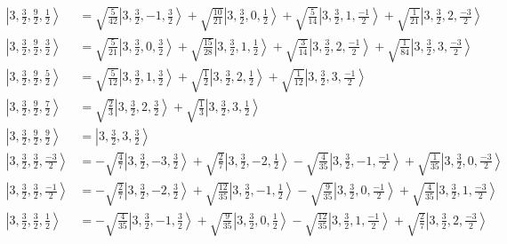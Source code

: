 \documentclass{report}
\newcommand{\ket}[1]{\left| #1 \right>} %
\begin{document}
\begin{align*}
\ket{ 3 ,  \frac{3}{2} ,  \frac{9}{2} ,  \frac{1}{2}  } &=  \sqrt{  \frac{5}{42}  } \ket{ 3 ,  \frac{3}{2} ,  -1 ,  \frac{3}{2}  } + \sqrt{  \frac{10}{21}  } \ket{ 3 ,  \frac{3}{2} ,  0 ,  \frac{1}{2}  } + \sqrt{  \frac{5}{14}  } \ket{ 3 ,  \frac{3}{2} ,  1 ,  \frac{-1}{2}  } + \sqrt{  \frac{1}{21}  } \ket{ 3 ,  \frac{3}{2} ,  2 ,  \frac{-3}{2}  } \\
\ket{ 3 ,  \frac{3}{2} ,  \frac{9}{2} ,  \frac{3}{2}  } &=  \sqrt{  \frac{5}{21}  } \ket{ 3 ,  \frac{3}{2} ,  0 ,  \frac{3}{2}  } + \sqrt{  \frac{15}{28}  } \ket{ 3 ,  \frac{3}{2} ,  1 ,  \frac{1}{2}  } + \sqrt{  \frac{3}{14}  } \ket{ 3 ,  \frac{3}{2} ,  2 ,  \frac{-1}{2}  } + \sqrt{  \frac{1}{84}  } \ket{ 3 ,  \frac{3}{2} ,  3 ,  \frac{-3}{2}  } \\
\ket{ 3 ,  \frac{3}{2} ,  \frac{9}{2} ,  \frac{5}{2}  } &=  \sqrt{  \frac{5}{12}  } \ket{ 3 ,  \frac{3}{2} ,  1 ,  \frac{3}{2}  } + \sqrt{  \frac{1}{2}  } \ket{ 3 ,  \frac{3}{2} ,  2 ,  \frac{1}{2}  } + \sqrt{  \frac{1}{12}  } \ket{ 3 ,  \frac{3}{2} ,  3 ,  \frac{-1}{2}  } \\
\ket{ 3 ,  \frac{3}{2} ,  \frac{9}{2} ,  \frac{7}{2}  } &=  \sqrt{  \frac{2}{3}  } \ket{ 3 ,  \frac{3}{2} ,  2 ,  \frac{3}{2}  } + \sqrt{  \frac{1}{3}  } \ket{ 3 ,  \frac{3}{2} ,  3 ,  \frac{1}{2}  } \\
\ket{ 3 ,  \frac{3}{2} ,  \frac{9}{2} ,  \frac{9}{2}  } &=  \ket{ 3 ,  \frac{3}{2} ,  3 ,  \frac{3}{2}  } \\
\ket{ 3 ,  \frac{3}{2} ,  \frac{3}{2} ,  \frac{-3}{2}  } &=  - \sqrt{  \frac{4}{7}  } \ket{ 3 ,  \frac{3}{2} ,  -3 ,  \frac{3}{2}  } + \sqrt{  \frac{2}{7}  } \ket{ 3 ,  \frac{3}{2} ,  -2 ,  \frac{1}{2}  } - \sqrt{  \frac{4}{35}  } \ket{ 3 ,  \frac{3}{2} ,  -1 ,  \frac{-1}{2}  } + \sqrt{  \frac{1}{35}  } \ket{ 3 ,  \frac{3}{2} ,  0 ,  \frac{-3}{2}  } \\
\ket{ 3 ,  \frac{3}{2} ,  \frac{3}{2} ,  \frac{-1}{2}  } &=  - \sqrt{  \frac{2}{7}  } \ket{ 3 ,  \frac{3}{2} ,  -2 ,  \frac{3}{2}  } + \sqrt{  \frac{12}{35}  } \ket{ 3 ,  \frac{3}{2} ,  -1 ,  \frac{1}{2}  } - \sqrt{  \frac{9}{35}  } \ket{ 3 ,  \frac{3}{2} ,  0 ,  \frac{-1}{2}  } + \sqrt{  \frac{4}{35}  } \ket{ 3 ,  \frac{3}{2} ,  1 ,  \frac{-3}{2}  } \\
\ket{ 3 ,  \frac{3}{2} ,  \frac{3}{2} ,  \frac{1}{2}  } &=  - \sqrt{  \frac{4}{35}  } \ket{ 3 ,  \frac{3}{2} ,  -1 ,  \frac{3}{2}  } + \sqrt{  \frac{9}{35}  } \ket{ 3 ,  \frac{3}{2} ,  0 ,  \frac{1}{2}  } - \sqrt{  \frac{12}{35}  } \ket{ 3 ,  \frac{3}{2} ,  1 ,  \frac{-1}{2}  } + \sqrt{  \frac{2}{7}  } \ket{ 3 ,  \frac{3}{2} ,  2 ,  \frac{-3}{2}  } \\

\end{align*}
\end{document}
